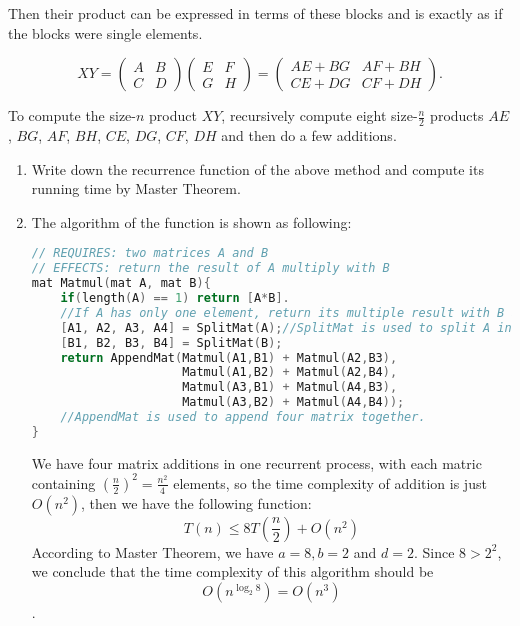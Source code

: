 \documentclass[12pt,a4paper]{article}
\makeatletter
\newtheorem*{solution}{Solution}
\theoremstyle{definition}
\renewenvironment{solution}[1][Solution] {\par\pushQED{\qed}\normalfont\topsep6\p@\@plus6\p@\relax\trivlist\item[\hskip\labelsep\bfseries#1\@addpunct{.}]\ignorespaces}{\popQED\endtrivlist\@endpefalse} \makeatother
\makeatother
\begin{document}
\begin{enumerate}
Then their product can be expressed in terms of these blocks and is exactly as if the blocks were single elements.

 \begin{displaymath}
 XY=
\left(\begin{array}{c|c}
A & B \\
\hline
C & D \end{array}\right)
\left(\begin{array}{c|c}
E & F \\
\hline
G & H \end{array}\right)
=
\left(\begin{array}{c|c}
AE+BG & AF+BH \\
\hline
CE+DG & CF+DH \end{array}\right).
 \end{displaymath}

To compute the size-$n$ product $XY$, recursively compute eight size-$\frac{n}{2}$ products $AE$,  $BG$, $AF$, $BH$, $CE$, $DG$, $CF$, $DH$ and then do a few additions.

\begin{enumerate}
\item Write down the recurrence function of the above method and compute its running time by Master Theorem.

\begin{solution}
The algorithm of the function is shown as following:

\begin{lstlisting}[language=C++]
// REQUIRES: two matrices A and B
// EFFECTS: return the result of A multiply with B
mat Matmul(mat A, mat B){
    if(length(A) == 1) return [A*B].
    //If A has only one element, return its multiple result with B as a matrix with one element
    [A1, A2, A3, A4] = SplitMat(A);//SplitMat is used to split A into four parts.
    [B1, B2, B3, B4] = SplitMat(B);
    return AppendMat(Matmul(A1,B1) + Matmul(A2,B3),
                     Matmul(A1,B2) + Matmul(A2,B4),
                     Matmul(A3,B1) + Matmul(A4,B3),
                     Matmul(A3,B2) + Matmul(A4,B4));
    //AppendMat is used to append four matrix together.
}
\end{lstlisting}
We have four matrix additions in one recurrent process, with each matric containing $({\frac {n}{2}})^2=\frac {n^2}{4}$ elements, so the time complexity of addition is just $O(n^2)$, then we have the following function: $$T(n) \leq 8T(\frac{n}{2}) + O(n^2)$$
According to Master Theorem, we have $a=8,b=2$ and $d=2$. Since $8>2^2$, we conclude that the time complexity of this algorithm should be $$O(n^{\log_{2} {8}})=O(n^3)$$.


\end{solution}
\end{enumerate}
\end{enumerate}
\end{document}
